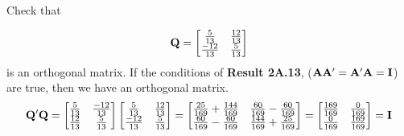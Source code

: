Check that
        
        \[
            \bold{Q} = \begin{bmatrix}
                \frac{5}{13} & \frac{12}{13} \\
                \frac{-12}{13} & \frac{5}{13}
            \end{bmatrix}
        \]
        is an orthogonal matrix.
        \newline
        \newline
        If the conditions of \textbf{Result 2A.13}, ($\bold{A}\bold{A}^\prime = \bold{A}^\prime \bold{A} = \bold{I}$) are true, then we have an orthogonal matrix.
        \[
            \bold{Q}^\prime \bold{Q} = 
            \begin{bmatrix}
                \frac{5}{13} & \frac{-12}{13} \\
                \frac{12}{13} & \frac{5}{13}
            \end{bmatrix}
            \begin{bmatrix}
                \frac{5}{13} & \frac{12}{13} \\
                \frac{-12}{13} & \frac{5}{13}
            \end{bmatrix} =
            \begin{bmatrix}
                \frac{25}{169} + \frac{144}{169} & \frac{60}{169} - \frac{60}{169} \\
                \frac{60}{169} - \frac{60}{169} & \frac{144}{169} + \frac{25}{169}
            \end{bmatrix} =
            \begin{bmatrix}
                \frac{169}{169} & \frac{0}{169} \\
                \frac{0}{169} & \frac{169}{169}
            \end{bmatrix} =
            \bold{I}
        \]

